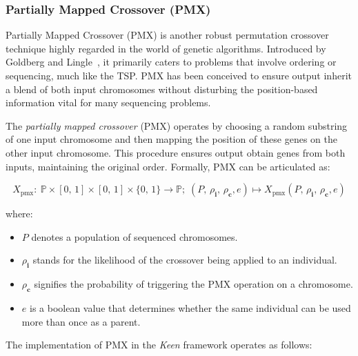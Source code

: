 \subsubsection{Partially Mapped Crossover (PMX)}
\label{sec:keen:op:cx:partially_mapped}
  Partially Mapped Crossover (PMX) is another robust permutation crossover 
  technique highly regarded in the world of genetic algorithms. Introduced by 
  Goldberg and Lingle~\autocite{goldbergAllelesLociTraveling1985}, it primarily 
  caters to problems that involve ordering or sequencing, much like the TSP. PMX 
  has been conceived to ensure output inherit a blend of both input 
  chromosomes without disturbing the position-based information vital for many 
  sequencing problems.

  \begin{definition}
    The \textit{partially mapped crossover} (PMX) operates by choosing a random 
    substring of one input chromosome and then mapping the position of these 
    genes on the other input chromosome. This procedure ensures output 
    obtain genes from both inputs, maintaining the original order. Formally, 
    PMX can be articulated as:

    \begin{equation}
      X_\mathrm{pmx} :\: 
        \mathbb{P} \times [0,\, 1] \times [0,\, 1] \times \{0,\, 1\} \rightarrow \mathbb{P};\;
        (P,\, \rho_\mathbf{i},\, \rho_\mathbf{c}, e) \mapsto X_\mathrm{pmx}(P,\, \rho_\mathbf{i},\, \rho_\mathbf{c}, e)
    \end{equation}

    where:

    \begin{itemize}
      \item \(P\) denotes a population of sequenced chromosomes.
      \item \(\rho_\mathbf{i}\) stands for the likelihood of the crossover being applied to an individual.
      \item \(\rho_\mathbf{c}\) signifies the probability of triggering the PMX operation on a chromosome.
      \item \(e\) is a boolean value that determines whether the same individual can be used more than once as a parent.
    \end{itemize}
  \end{definition}

  The implementation of PMX in the \textit{Keen} framework operates as follows:

